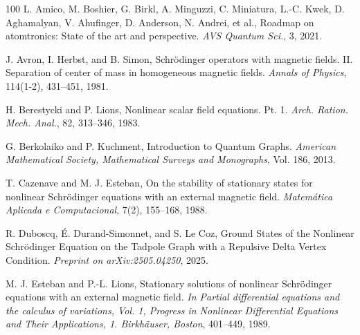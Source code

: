 \documentclass[12pt,a4paper]{amsart}
\theoremstyle{definition}
\theoremstyle{plain}
\numberwithin{equation}{section}
\begin{document}
\begin{thebibliography}{100}
{\sc L. Amico, M. Boshier, G. Birkl, A. Minguzzi, C. Miniatura, L.-C. Kwek, D. Aghamalyan, V. Ahufinger, D. Anderson, N. Andrei, et al.}, Roadmap on atomtronics: State of the art and perspective. {\em AVS Quantum Sci.}, 3, 2021.


{\sc J. Avron, I. Herbst, and B. Simon}, Schrödinger operators with magnetic fields. II. Separation of center of mass in homogeneous magnetic fields. {\em Annals of Physics}, 114(1-2), 431--451, 1981.


{\sc H. Berestycki and P. Lions}, Nonlinear scalar field equations. Pt. 1. {\em Arch. Ration. Mech. Anal.}, 82, 313--346, 1983.

{\sc G. Berkolaiko and P. Kuchment}, Introduction to Quantum Graphs. {\em American Mathematical Society, Mathematical Surveys and Monographs}, Vol. 186, 2013.

{\sc T. Cazenave and M. J. Esteban}, On the stability of stationary states for nonlinear Schrödinger equations with an external magnetic field. {\em Matemática Aplicada e Computacional}, 7(2), 155--168, 1988.



{\sc R. Duboscq, É. Durand-Simonnet, and S. Le Coz}, Ground States of the Nonlinear Schrödinger Equation on the Tadpole Graph with a Repulsive Delta Vertex Condition. {\em Preprint on arXiv:2505.04250}, 2025.

{\sc M. J. Esteban and P.-L. Lions}, Stationary solutions of nonlinear Schrödinger equations with an external magnetic field. {\em In Partial differential equations and the calculus of variations, Vol. 1, Progress in Nonlinear Differential Equations and Their Applications, 1. Birkhäuser, Boston}, 401--449, 1989.


\end{thebibliography}
\end{document}
